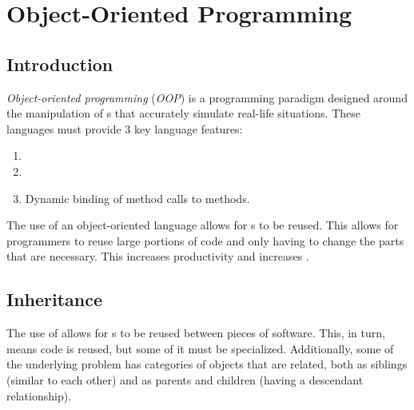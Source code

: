 \section{Object-Oriented Programming}\label{sec:Object_Oriented_Programming}
\subsection{Introduction}\label{subsec:OOP_Intro}
\begin{definition}\label{def:Object_Oriented_Programming}
  \emph{Object-oriented programming} (\emph{OOP}) is a programming paradigm designed around the manipulation of s that accurately simulate real-life situations.
  These languages must provide 3 key language features:
  \begin{enumerate}[noitemsep]
  \item {}
  \item {}
  \item Dynamic binding of method calls to methods.
  \end{enumerate}

  The use of an object-oriented language allows for s to be reused.
  This allows for programmers to reuse large portions of code and only having to change the parts that are necessary.
  This increases productivity and increases .
\end{definition}

\subsection{Inheritance}\label{subsec:OOP_Inheritance}
The use of  allows for s to be reused between pieces of software.
This, in turn, means code is reused, but some of it must be specialized.
Additionally, some of the underlying problem has categories of objects that are related, both as siblings (similar to each other) and as parents and children (having a descendant relationship).

